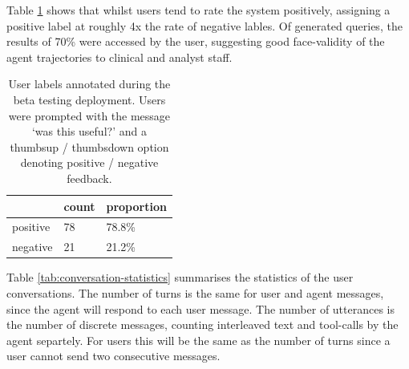 \documentclass[11pt]{article}
\begin{document}
Table \ref{tab:user-feedback} shows that whilst users tend to rate the system positively, assigning a positive label at roughly 4x the rate of negative lables.
Of generated queries, the results of 70\% were accessed by the user, suggesting good face-validity of the agent trajectories to clinical and analyst staff.



\begin{table}[ht]
\centering
\begin{tabular}{|l|l|l|}
\hline
	            & count &  proportion \\	
\hline
	positive 	& 78 & 78.8\%	\\
\hline
	negative 	& 21 & 21.2\%\\
\hline
\end{tabular}
\caption{
	User labels annotated during the beta testing deployment.
	Users were prompted with the message `was this useful?' and a thumbsup / thumbsdown option denoting positive / negative feedback.\\
}
\label{tab:user-feedback}
\end{table}



Table \ref{tab:conversation-statistics} summarises the statistics of the user conversations.
The number of turns is the same for user and agent messages, since the agent will respond to each user message.
The number of utterances is the number of discrete messages, counting interleaved text and tool-calls by the agent separtely.
For users this will be the same as the number of turns since a user cannot send two consecutive messages.
\end{document}

